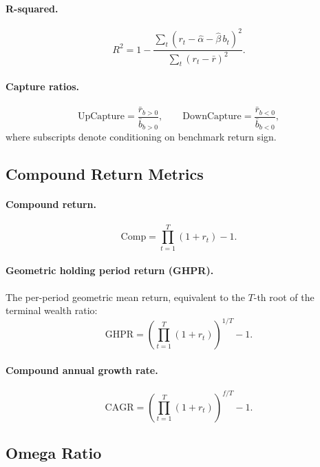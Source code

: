 \documentclass[11pt,a4paper]{article}
\begin{document}
\paragraph{R-squared.}
\begin{equation}
  R^2 = 1 - \frac{\sum_t(r_t - \hat\alpha - \hat\beta\,b_t)^2}{\sum_t(r_t - \bar r)^2}.
\end{equation}

\paragraph{Capture ratios.}
\begin{equation}
  \mathrm{UpCapture} = \frac{\bar{r}_{b>0}}{\bar{b}_{b>0}}, \qquad
  \mathrm{DownCapture} = \frac{\bar{r}_{b<0}}{\bar{b}_{b<0}},
\end{equation}
where subscripts denote conditioning on benchmark return sign.

\subsection{Compound Return Metrics}

\paragraph{Compound return.}
\begin{equation}
  \mathrm{Comp} = \prod_{t=1}^{T}(1 + r_t) - 1.
\end{equation}

\paragraph{Geometric holding period return (GHPR).}
The per-period geometric mean return, equivalent to the $T$-th root of the
terminal wealth ratio:
\begin{equation}
  \mathrm{GHPR} = \left(\prod_{t=1}^{T}(1 + r_t)\right)^{1/T} - 1.
\end{equation}

\paragraph{Compound annual growth rate.}
\begin{equation}
  \mathrm{CAGR} = \left(\prod_{t=1}^{T}(1 + r_t)\right)^{f/T} - 1.
\end{equation}

\subsection{Omega Ratio}
\end{document}

